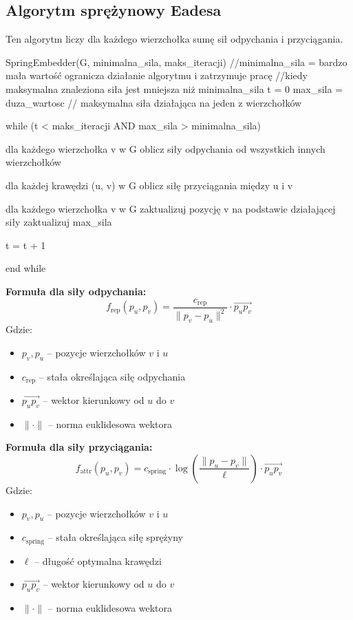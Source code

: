 \documentclass[]{article}
\begin{document}
	\subsection{Algorytm sprężynowy Eadesa}
	Ten algorytm liczy dla każdego wierzchołka sumę sił odpychania i przyciągania.
	\begin{mylisting}
SpringEmbedder(G, minimalna_sila, maks_iteracji)
//minimalna_sila = bardzo mała wartość ogranicza działanie algorytmu i zatrzymuje pracę
//kiedy maksymalna znaleziona siła jest mniejsza niż minimalna_sila
t = 0
max_sila = duza_wartosc // maksymalna siła działająca na jeden z wierzchołków

while (t < maks_iteracji AND max_sila > minimalna_sila)

    dla każdego wierzchołka v w G
        oblicz siły odpychania od wszystkich innych wierzchołków

    dla każdej krawędzi (u, v) w G
        oblicz siłę przyciągania między u i v

    dla każdego wierzchołka v w G
        zaktualizuj pozycję v na podstawie działającej siły
        zaktualizuj max_sila

    t = t + 1

end while
\end{mylisting}
\textbf{Formuła dla siły odpychania:}
\begin{equation}
	f_{\mathrm{rep}}(p_u,p_v) =
	\frac{c_{\mathrm{rep}}}{\|p_v - p_u\|^2} \cdot \vec{p_u p_v}
\end{equation}
Gdzie:
\begin{itemize}
    \item $p_v, p_u$ -- pozycje wierzchołków $v$ i $u$
    \item $c_{\mathrm{rep}}$ -- stała określająca siłę odpychania
    \item $\vec{p_u p_v}$ -- wektor kierunkowy od $u$ do $v$
    \item $\|\cdot\|$ -- norma euklidesowa wektora
\end{itemize}
\textbf{Formuła dla siły przyciągania:}
\begin{equation}
	f_{\mathrm{attr}}(p_u,p_v) =
	c_{\mathrm{spring}} \cdot
	\log\!\left(\frac{\|p_u - p_v\|}{\ell}\right)
	\cdot \vec{p_u p_v}
\end{equation}
Gdzie:
\begin{itemize}
    \item $p_v, p_u$ -- pozycje wierzchołków $v$ i $u$
    \item $c_{\mathrm{spring}}$ -- stała określająca siłę sprężyny
    \item $\ell$ -- długość optymalna krawędzi
    \item $\vec{p_u p_v}$ -- wektor kierunkowy od $u$ do $v$
    \item $\|\cdot\|$ -- norma euklidesowa wektora
\end{itemize}
\end{document}
